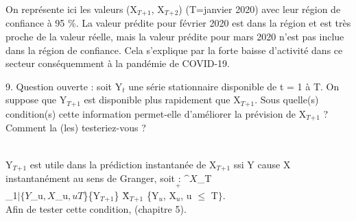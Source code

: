 \documentclass[a4paper, 12pt]{article} %
\begin{document}
\small{
{On représente ici les valeurs (X$_T$$_+$$_1$, X$_T$$_+$$_2$) (T=janvier 2020) avec leur région de confiance à 95 \%. La valeur prédite pour février 2020 est dans la région et est très proche de la valeur réelle, mais la valeur prédite pour mars 2020 n'est pas inclue dans la région de confiance. Cela s'explique par la forte baisse d'activité dans ce secteur conséquemment à la pandémie de COVID-19.\\
}}
\begin{tcolorbox}
{\normalsize
9. Question ouverte : soit Y$_t$ une série stationnaire disponible de t = 1 à T. On suppose que Y$_T$$_+$$_1$
est disponible plus rapidement que X$_T$$_+$$_1$. Sous quelle(s) condition(s) cette information permet-elle
d’améliorer la prévision de X$_T$$_+$$_1$ ? Comment la (les) testeriez-vous ?
}
\end{tcolorbox}
\\
\small{
{Y$_T$$_+$$_1$ est utile dans la prédiction instantanée de X$_T$$_+$$_1$ ssi Y cause X instantanément au sens de Granger, soit : $\^{X}$_T$$_+$$_1$ \vert \{Y$_u$, X$_u$, u $\leq$ T$\}\cup\{Y$_T$$_+$$_1$\} \neq \^{X}$_T$$_+$$_1$ \vert \{Y$_u$, X$_u$, u $\leq$ T$\}.$\\Afin de tester cette condition, (chapitre 5).
}}
\end{document}
